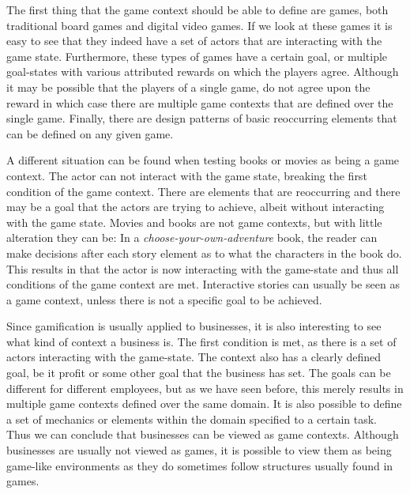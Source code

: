 \documentclass[11pt]{article}
\begin{document}
The first thing that the game context should be able to define are games, both traditional board games and digital video games. If we look at these games it is easy to see that they indeed have a set of actors that are interacting with the game state. Furthermore, these types of games have a certain goal, or multiple goal-states with various attributed rewards on which the players agree. Although it may be possible that the players of a single game, do not agree upon the reward in which case there are multiple game contexts that are defined over the single game. Finally, there are design patterns of basic reoccurring elements that can be defined on any given game. 

A different situation can be found when testing books or movies as being a game context. The actor can not interact with the game state, breaking the first condition of the game context. There are elements that are reoccurring and there may be a goal that the actors are trying to achieve, albeit without interacting with the game state. Movies and books are not game contexts, but with little alteration they can be: In a \emph{choose-your-own-adventure} book, the reader can make decisions after each story element as to what the characters in the book do. This results in that the actor is now interacting with the game-state and thus all conditions of the game context are met. Interactive stories can usually be seen as a game context, unless there is not a specific goal to be achieved.

Since gamification is usually applied to businesses, it is also interesting to see what kind of context a business is. The first condition is met, as there is a set of actors interacting with the game-state. The context also has a clearly defined goal, be it profit or some other goal that the business has set. The goals can be different for different employees, but as we have seen before, this merely results in multiple game contexts defined over the same domain. It is also possible to define a set of mechanics or elements within the domain specified to a certain task. Thus we can conclude that businesses can be viewed as game contexts. Although businesses are usually not viewed as games, it is possible to view them as being game-like environments as they do sometimes follow structures usually found in games.
\end{document}
